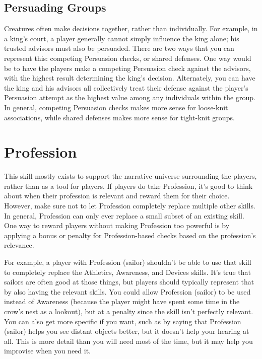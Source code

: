   \subsection{Persuading Groups}
    Creatures often make decisions together, rather than individually.
    For example, in a king's court, a player generally cannot simply influence the king alone; his trusted advisors must also be persuaded.
    There are two ways that you can represent this: competing Persuasion checks, or shared defenses.
    One way would be to have the players make a competing Persuasion check against the advisors, with the highest result determining the king's decision.
    Alternately, you can have the king and his advisors all collectively treat their defense against the player's Persuasion attempt as the highest value among any individuals within the group.
    In general, competing Persuasion checks makes more sense for loose-knit associations, while shared defenses makes more sense for tight-knit groups.

\section{Profession}
  This skill mostly exists to support the narrative universe surrounding the players, rather than as a tool for players.
  If players do take Profession, it's good to think about when their profession is relevant and reward them for their choice.
  However, make sure not to let Profession completely replace multiple other skills.
  In general, Profession can only ever replace a small subset of an existing skill.
  One way to reward players without making Profession too powerful is by applying a bonus or penalty for Profession-based checks based on the profession's relevance.

  For example, a player with Profession (sailor) shouldn't be able to use that skill to completely replace the Athletics, Awareness, and Devices skills.
  It's true that sailors are often good at those things, but players should typically represent that by also having the relevant skills.
  You could allow Profession (sailor) to be used instead of Awareness (because the player might have spent some time in the crow's nest as a lookout), but at a penalty since the skill isn't perfectly relevant.
  You can also get more specific if you want, such as by saying that Profession (sailor) helps you see distant objects better, but it doesn't help your hearing at all.
  This is more detail than you will need most of the time, but it may help you improvise when you need it.

